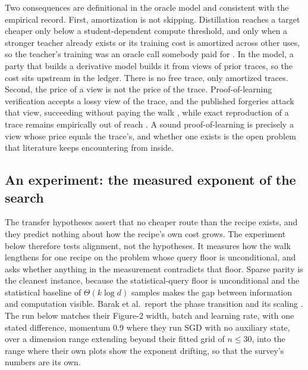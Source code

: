Two consequences are definitional in the oracle model and consistent with the
empirical record. First, amortization is not skipping. Distillation reaches a
target cheaper only below a student-dependent compute threshold, and only when
a stronger teacher already exists or its training cost is amortized across
other uses, so the teacher's training was an oracle call somebody paid for
\cite{BSWRLW25}. In the model, a
party that builds a derivative model builds it from views of prior traces, so
the cost sits upstream in the ledger. There is no free trace, only amortized traces. Second, the
price of a view is not the price of the trace. Proof-of-learning verification
accepts a lossy view of the trace, and the published forgeries attack that view,
succeeding without paying the walk \cite{FJTYCDCP23}, while exact reproduction
of a trace remains empirically out of reach \cite{SHKBL25}. A sound
proof-of-learning is precisely a view whose price equals the trace's, and
whether one exists is the open problem that literature keeps encountering from
inside.

\subsection{An experiment: the measured exponent of the search}
\label{sec:price-experiment}

The transfer hypotheses assert that no cheaper route than the recipe exists,
and they predict nothing about how the recipe's own cost grows. The experiment
below therefore tests alignment, not the hypotheses. It measures how the walk
lengthens for one recipe on the problem whose query floor is unconditional, and
asks whether anything in the measurement contradicts that floor. Sparse parity is the cleanest instance, because the
statistical-query floor is unconditional and the statistical baseline of
$\Theta(k \log d)$ samples makes the gap between information and computation
visible. Barak et al.\ report the phase transition and its scaling
\cite{BEGKMZ22}. The run below matches their Figure-2 width, batch and learning rate, with one
stated difference, momentum 0.9 where they run SGD with no auxiliary state, over
a dimension range extending beyond their fitted grid of $n \le 30$, into the
range where their own plots show the exponent drifting, so that the survey's
numbers are its own.

